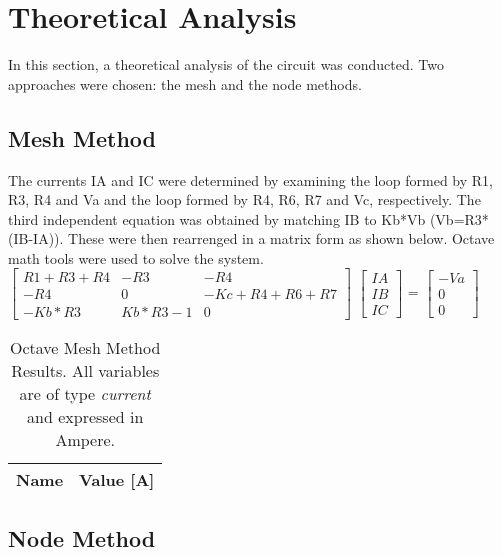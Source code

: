 

\section {Theoretical Analysis}
\label{analysis}

In this section, a theoretical analysis of the circuit was conducted. Two approaches were chosen: the mesh and the node methods.



\subsection{Mesh Method}
The currents IA and IC were determined by examining the loop formed by R1, R3, R4 and Va and the loop formed by R4, R6, R7 and Vc, respectively. The third independent equation was obtained by matching IB to Kb*Vb (Vb=R3*(IB-IA)). These were then rearrenged in a matrix form as shown below. Octave math tools were used to solve the system.\\

$\begin{bmatrix}
R1+R3+R4 & -R3 & -R4\\
   
-R4 & 0 & -Kc+R4+R6+R7\\

-Kb*R3 & Kb*R3-1 & 0
\end{bmatrix}$
$\begin{bmatrix}
IA\\
IB\\
IC
\end{bmatrix}$
= 
$\begin{bmatrix}
-Va\\
0\\
0
\end{bmatrix}$

\begin{table}[ht]
  \centering
  \begin{tabular}{|l|r|}
    \hline    
    {\bf Name} & {\bf Value [A]} \\ \hline
    
  \end{tabular}
  \caption{Octave Mesh Method Results. All variables are of type {\em current}
    and expressed in Ampere.}
  \label{tab:malhas}
\end{table}


\subsection{Node Method}


